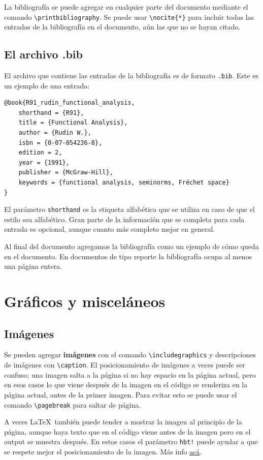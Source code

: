 \documentclass[12pt, spanish]{report}
\theoremstyle{definition} %
\theoremstyle{remark} %
\theoremstyle{plain} %
\theoremstyle{plain} %
\theoremstyle{plain} %
\theoremstyle{plain} %
\theoremstyle{plain} %
\theoremstyle{remark} %
\numberwithin{defn}{chapter}
\begin{document}
La bibliografía se puede agregar en cualquier parte del documento mediante el comando \verb|\printbibliography|. Se puede usar \verb|\nocite{*}| para incluir todas las entradas de la bibliografía en el documento, aún las que no se hayan citado.

\subsection{El archivo .bib}

El archivo que contiene las entradas de la bibliografía es de formato \verb|.bib|. Este es un ejemplo de una entrada:
\begin{verbatim}
@book{R91_rudin_functional_analysis,
    shorthand = {R91},
    title = {Functional Analysis},
    author = {Rudin W.},
    isbn = {0-07-054236-8},
    edition = 2,
    year = {1991},
    publisher = {McGraw-Hill},
    keywords = {functional analysis, seminorms, Fréchet space}
}
\end{verbatim}
El parámetro \verb|shorthand| es la etiqueta alfabética que se utiliza en caso de que el estilo sea alfabético. Gran parte de la información que se completa para cada entrada es opcional, aunque cuanto más completo mejor en general.

Al final del documento agregamos la bibliografía como un ejemplo de cómo queda en el documento. En documentos de tipo reporte la bibliografía ocupa al menos una página entera.

\section{Gráficos y misceláneos}

\subsection{Imágenes}

Se pueden agregar \textbf{imágenes} con el comando \verb|\includegraphics| y descripciones de imágenes con \verb|\caption|. El posicionamiento de imágenes a veces puede ser confuso; una imagen salta a la página si no hay espacio en la página actual, pero en esos casos lo que viene después de la imagen en el código se renderiza en la página actual, antes de la primer imagen. Para evitar esto se puede usar el comando \verb|\pagebreak| para saltar de página.

A veces \LaTeX\ también puede tender a mostrar la imagen al principio de la página, aunque haya texto que en el código viene antes de la imagen pero en el output se muestra después. En estos casos el parámetro \verb|hbt!| puede ayudar a que se respete mejor el posicionamiento de la imagen. Más info \href{https://www.overleaf.com/learn/latex/Questions/How_can_I_get_my_table_or_figure_to_stay_where_they_are\%2C_instead_of_going_to_the_next_page\%3F}{acá}.
\end{document}
